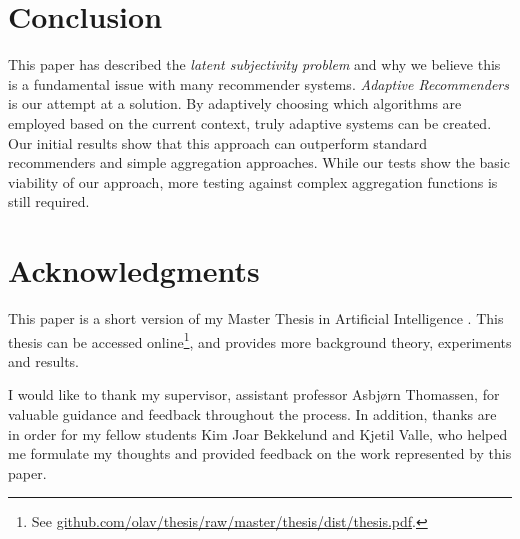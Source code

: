 \section{Conclusion}
\label{sec:conclusion}

This paper has described the \emph{latent subjectivity problem}
and why we believe this is a fundamental issue
with many recommender systems.
\emph{Adaptive Recommenders} is our 
attempt at a solution.
By adaptively choosing which algorithms are employed
based on the current context,
truly adaptive systems can be created.
Our initial results show that this approach
can outperform standard recommenders
and simple aggregation approaches.
While our tests show the basic viability of our approach,
more testing against complex aggregation functions
is still required.


\section*{Acknowledgments}
\label{sec:method}

This paper is a short version of my Master Thesis in Artificial Intelligence
\cite{Bjorkoy2011}.
This thesis can be accessed 
online\footnote{See \url{github.com/olav/thesis/raw/master/thesis/dist/thesis.pdf}.},
and provides more background theory, 
experiments and results.

I would like to thank my supervisor, assistant professor Asbjørn Thomassen, for valuable guidance and feedback throughout the process.
In addition, thanks are in order for my fellow students 
Kim Joar Bekkelund and Kjetil Valle,
who helped me formulate my thoughts and provided feedback on the work represented by this paper.



